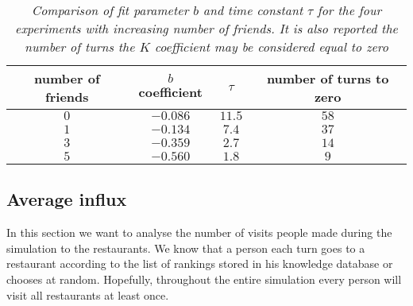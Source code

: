 \documentclass[10pt,a4paper,usenatbib]{article}
\begin{document}
\begin{table}[!htb]
\centering
\begin{tabular}{cccc}
\hline
number of friends & $b$ coefficient & $\tau$ & number of turns to zero \\ \hline
$0$ & $- 0.086$ & $11.5$ & $58$ \\ 
$1$ & $- 0.134$ & $7.4$ & $37$ \\ 
$3$ & $- 0.359$ & $2.7$ & $14$ \\ 
$5$ & $- 0.560$ & $1.8$ & $9$ \\ \hline
\end{tabular}
\caption{\small \textit{Comparison of fit parameter $b$ and time constant $\tau$ for the four experiments with increasing number of friends. It is also reported the number of turns the $K$ coefficient may be considered equal to zero}}
\label{tab:fit}
\end{table}

\pagebreak


\subsection{Average influx}
\label{subsec:avg_influx}

In this section we want to analyse the number of visits people made during the simulation to the restaurants.
We know that a person each turn goes to a restaurant according to the list of rankings stored in his knowledge database or chooses at random.
Hopefully, throughout the entire simulation every person will visit all restaurants at least once. 
\end{document}
